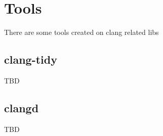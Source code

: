 \chapter{Tools}
There are some tools created on clang related libs

\section{clang-tidy}
TBD

\section{clangd}
TBD
